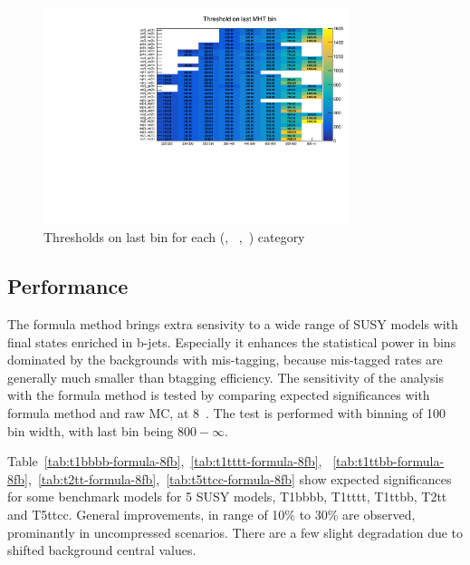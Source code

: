 \begin{figure}[h!]
  \centering
  \includegraphics[width=0.8\textwidth]{figures/btagformula/Ewk_lastMhtBin.pdf} 
  \caption{\label{fig:lastMhtBin} Thresholds on last \mht bin for each (\njet,
  ~\nb,~\scalht) category}
\end{figure}


\subsection{Performance}
The formula method brings extra sensivity to a wide range of SUSY models with final
states enriched in b-jets.
Especially it enhances the statistical power in bins dominated by the backgrounds 
with mis-tagging, because mis-tagged rates are generally much smaller than 
btagging efficiency. The sensitivity of the analysis with the formula method is 
tested by comparing expected significances with formula method and raw MC, 
at 8~\ifb. The test is performed with \mht binning of 100 \gev bin 
width, with last \mht bin being $800-\infty$.

Table~\ref{tab:t1bbbb-formula-8fb},~\ref{tab:t1tttt-formula-8fb},
~\ref{tab:t1ttbb-formula-8fb},~\ref{tab:t2tt-formula-8fb},~\ref{tab:t5ttcc-formula-8fb} 
show expected significances for some benchmark models for 5 SUSY models, T1bbbb, 
T1tttt, T1ttbb, T2tt and T5ttcc. General improvements, in range of 10\% to 30\%
 are observed, prominantly in uncompressed scenarios. There are a few slight 
 degradation due to shifted background central values.

%



















